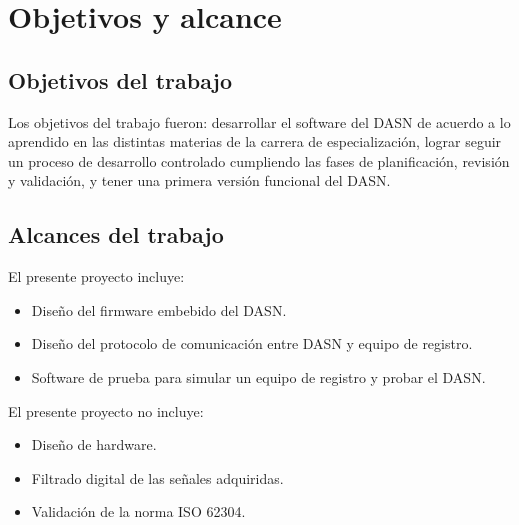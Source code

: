 \section{Objetivos y alcance}
\subsection{Objetivos del trabajo}
Los objetivos del trabajo fueron: desarrollar el software del DASN de acuerdo a lo aprendido en las distintas materias de la carrera de especialización, lograr seguir un proceso de desarrollo controlado cumpliendo las fases de planificación, revisión y validación, y tener una primera versión funcional del DASN.

\subsection{Alcances del trabajo}
El presente proyecto incluye:
\begin{itemize}
\item Diseño del firmware embebido del DASN.
\item Diseño del protocolo de comunicación entre DASN y equipo de registro.
\item Software de prueba para simular un equipo de registro y probar el DASN.
\end{itemize}

El presente proyecto no incluye:
\begin{itemize}
\item Diseño de hardware.
\item Filtrado digital de las señales adquiridas.
\item Validación de la norma ISO 62304.
\end{itemize}

